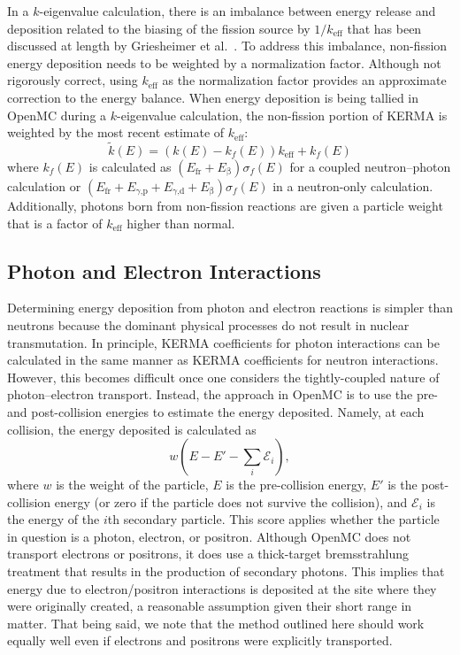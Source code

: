\documentclass{anstrans}
\newcommand{\efr}{E_\text{fr}}
\newcommand{\egp}{E_\text{$\gamma$,p}}
\newcommand{\egd}{E_\text{$\gamma$,d}}
\newcommand{\eb}{E_\upbeta}
\begin{document}
In a $k$-eigenvalue calculation, there is an imbalance between energy release
and deposition related to the biasing of the fission source by $1/k_\text{eff}$
that has been discussed at length by Griesheimer et
al.~\cite{griesheimer2020physor}. To address this imbalance, non-fission energy
deposition needs to be weighted by a normalization factor. Although not
rigorously correct, using $k_\text{eff}$ as the normalization factor provides an
approximate correction to the energy balance. When energy deposition is being
tallied in OpenMC during a $k$-eigenvalue calculation, the non-fission portion
of KERMA is weighted by the most recent estimate of $k_\text{eff}$:
\begin{equation}
    \tilde{k}(E) = \left ( k(E) - k_f(E) \right) k_\text{eff} + k_f(E)
\end{equation}
where $k_f(E)$ is calculated as $\left ( \efr + \eb \right ) \sigma_f(E)$ for a
coupled neutron--photon calculation or $\left ( \efr + \egp + \egd + \eb \right)
\sigma_f(E)$ in a neutron-only calculation. Additionally, photons born from
non-fission reactions are given a particle weight that is a factor of
$k_\text{eff}$ higher than normal.


\subsection{Photon and Electron Interactions}

Determining energy deposition from photon and electron reactions is simpler than
neutrons because the dominant physical processes do not result in nuclear
transmutation. In principle, KERMA coefficients for photon interactions can be
calculated in the same manner as KERMA coefficients for neutron interactions.
However, this becomes difficult once one considers the tightly-coupled nature of
photon--electron transport. Instead, the approach in OpenMC is to use the pre-
and post-collision energies to estimate the energy deposited. Namely, at each
collision, the energy deposited is calculated as
\begin{equation}
    w \left ( E - E' - \sum_i \mathcal{E}_i \right ),
\end{equation}
where $w$ is the weight of the particle, $E$ is the pre-collision energy, $E'$
is the post-collision energy (or zero if the particle does not survive the
collision), and $\mathcal{E}_i$ is the energy of the $i$th secondary particle.
This score applies whether the particle in question is a photon, electron, or
positron. Although OpenMC does not transport electrons or positrons, it does use
a thick-target bremsstrahlung treatment that results in the production of
secondary photons. This implies that energy due to electron/positron
interactions is deposited at the site where they were originally created, a
reasonable assumption given their short range in matter. That being said, we
note that the method outlined here should work equally well even if electrons
and positrons were explicitly transported.
\end{document}
